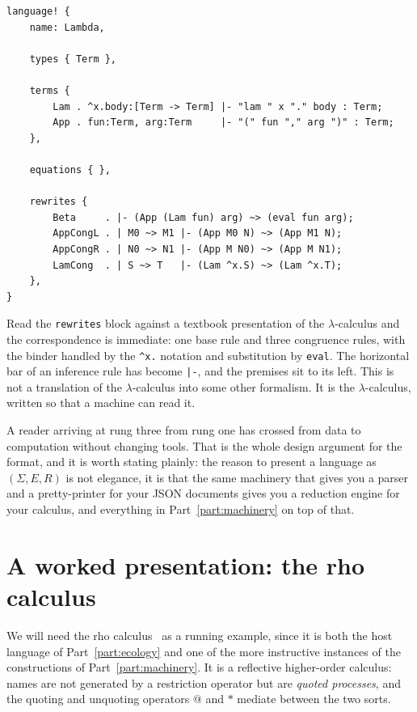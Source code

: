 \begin{lstlisting}
language! {
    name: Lambda,

    types { Term },

    terms {
        Lam . ^x.body:[Term -> Term] |- "lam " x "." body : Term;
        App . fun:Term, arg:Term     |- "(" fun "," arg ")" : Term;
    },

    equations { },

    rewrites {
        Beta     . |- (App (Lam fun) arg) ~> (eval fun arg);
        AppCongL . | M0 ~> M1 |- (App M0 N) ~> (App M1 N);
        AppCongR . | N0 ~> N1 |- (App M N0) ~> (App M N1);
        LamCong  . | S ~> T   |- (Lam ^x.S) ~> (Lam ^x.T);
    },
}
\end{lstlisting}

Read the \texttt{rewrites} block against a textbook presentation of the
$\lambda$-calculus and the correspondence is immediate: one base rule and three
congruence rules, with the binder handled by the \texttt{\^{}x.} notation and
substitution by \texttt{eval}. The horizontal bar of an inference rule has become
\texttt{|-}, and the premises sit to its left. This is not a translation of the
$\lambda$-calculus into some other formalism. It is the $\lambda$-calculus, written so
that a machine can read it.

\begin{remark}
A reader arriving at rung three from rung one has crossed from data to computation
without changing tools. That is the whole design argument for the format, and it is
worth stating plainly: the reason to present a language as $(\Sigma, E, R)$ is not
elegance, it is that the same machinery that gives you a parser and a pretty-printer
for your JSON documents gives you a reduction engine for your calculus, and everything
in Part~\ref{part:machinery} on top of that.
\end{remark}

\section{A worked presentation: the rho calculus}
\label{ob:subsec:rho-presentation}

We will need the rho calculus~\cite{meredith2005rho} as a running example, since
it is both the host language of Part~\ref{part:ecology} and one of the more instructive instances of
the constructions of Part~\ref{part:machinery}. It is a reflective higher-order calculus: names are not
generated by a restriction operator but are \emph{quoted processes}, and the quoting and
unquoting operators $@$ and $*$ mediate between the two sorts.

